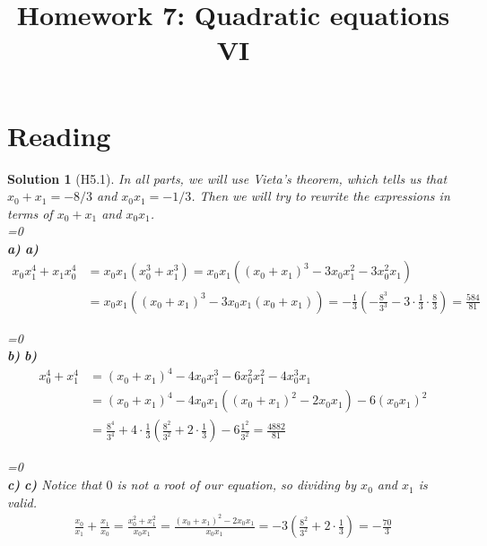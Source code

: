 \documentclass[a4paper,12pt]{article}
\title{Homework 7: Quadratic equations VI}
\theoremstyle{perfect}
\newtheorem{sol}{Solution}
\newcommand{\varline}{0}
\renewcommand\part[1]{
\ifnum\pdfstrcmp{\varline}{1}=0
    \vspace{.10in}\textbf{\\#1)}
  \else
    \textbf{#1)}
  \fi\renewcommand{\varline}{1}}
\begin{document}
 
\maketitle

\section{Reading}

\begin{sol}[H5.1]
In all parts, we will use Vieta's theorem, which tells us that $x_0+x_1 = -8/3$ and $x_0x_1 = -1/3$. Then we will try to rewrite the expressions in terms of $x_0+x_1$ and $x_0x_1$.\\
\part{a} \begin{align*}x_0x_1^4 + x_1x_0^4 & = x_0x_1(x_0^3+x_1^3) = x_0x_1((x_0+x_1)^3 - 3x_0x_1^2 - 3x_0^2x_1) \\ & = x_0x_1((x_0+x_1)^3 - 3x_0x_1(x_0+x_1)) = -\frac{1}{3}\left( -\frac{8^3}{3^3} - 3\cdot \frac{1}{3} \cdot \frac{8}{3} \right) = \frac{584}{81} \end{align*}
\part{b} \begin{align*}x_0^4 + x_1^4 & = (x_0+x_1)^4 - 4x_0x_1^3 - 6x_0^2x_1^2 - 4x_0^3x_1 \\ & = (x_0+x_1)^4 - 4x_0x_1((x_0+x_1)^2 - 2x_0x_1) - 6(x_0x_1)^2 \\ & =  \frac{8^4}{3^4} + 4\cdot \frac{1}{3}\left( \frac{8^2}{3^2} + 2\cdot \frac{1}{3} \right) - 6\frac{1^2}{3^2} = \frac{4882}{81} \end{align*}
\part{c} Notice that $0$ is not a root of our equation, so dividing by $x_0$ and $x_1$ is valid. \begin{align*}\frac{x_0}{x_1} + \frac{x_1}{x_0} = \frac{x_0^2 + x_1^2}{x_0x_1} = \frac{(x_0+x_1)^2 - 2x_0x_1}{x_0x_1} = -3\left(\frac{8^2}{3^2} + 2\cdot \frac{1}{3}\right) = -\frac{70}{3}\end{align*}
\end{sol}
\end{document}
